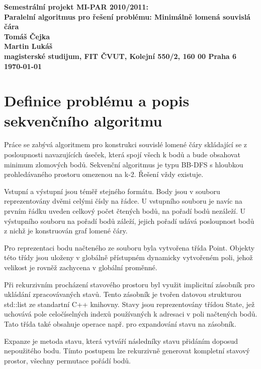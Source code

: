 \documentclass[12pt]{article}
\begin{document}

\begin{center}
\bf Semestrální projekt MI-PAR 2010/2011:\\[5mm]
    Paralelní algoritmus pro řešení problému: Minimálně lomená souvislá čára\\[5mm]
       Tomáš Čejka\\
	   Martin Lukáš\\[2mm]
magisterské studijum, FIT ČVUT, Kolejní 550/2, 160 00 Praha 6\\[2mm]
\today
\end{center}

\section{Definice problému a popis sekvenčního algoritmu}
Práce se zabývá algoritmem pro konstrukci souvislé lomené čáry skládající se z posloupnosti navazujících úseček, která spojí všech k bodů a bude obsahovat minimum zlomových bodů. 
Sekvenční algoritmus je typu BB-DFS s hloubkou prohledávaného prostoru omezenou na k-2. Řešení vždy existuje.

Vstupní a výstupní jsou téměř stejného formátu. Body jsou v souboru reprezentovány dvěmi celými čísly na řádce. U vstupního souboru je navíc na prvním řádku uveden celkový počet čtených bodů, na pořadí bodů nezáleží. U výstupního souboru na pořadí bodů záleží, jejich pořadí udává posloupnost bodů z nichž je konstruován graf lomené čáry.

Pro reprezentaci bodu načteného ze souboru byla vytvořena třída Point. Objekty této třídy jsou uloženy v globálně přístupném dynamicky vytvořeném poli, jehož velikost je rovněž zachycena v globální proměnné.

Při rekurzivním procházení stavového prostoru byl využit implicitní zásobník pro ukládání zpracovávaných stavů. Tento zásobník je tvořen datovou strukturou std::list ze standartní C++ knihovny. Stavy jsou reprezentovány třídou State, jež uchovává pole celočíselných indexů používaných k adresaci v poli načtených bodů. Tato třída také obsahuje operace např. pro expandování stavu na zásobník. 

Expanze je metoda stavu, která vytváří následníky stavu přidáním doposud nepoužitého bodu. Tímto postupem lze rekurzivně generovat kompletní stavový prostor, všechny permutace pořádí bodů. 
\end{document}
